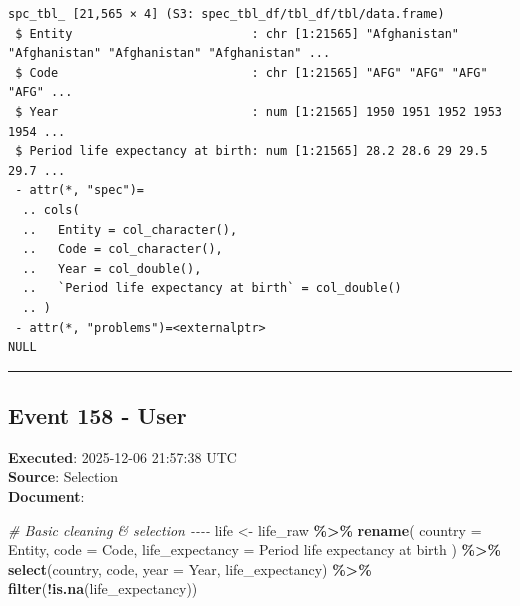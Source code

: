\documentclass[
  11pt,
]{article}
\newenvironment{Shaded}{\begin{snugshade}}{\end{snugshade}}
\newcommand{\AttributeTok}[1]{\textcolor[rgb]{0.13,0.29,0.53}{#1}}
\newcommand{\CommentTok}[1]{\textcolor[rgb]{0.56,0.35,0.01}{\textit{#1}}}
\newcommand{\FunctionTok}[1]{\textcolor[rgb]{0.13,0.29,0.53}{\textbf{#1}}}
\newcommand{\NormalTok}[1]{#1}
\newcommand{\OtherTok}[1]{\textcolor[rgb]{0.56,0.35,0.01}{#1}}
\newcommand{\SpecialCharTok}[1]{\textcolor[rgb]{0.81,0.36,0.00}{\textbf{#1}}}
\newcommand{\StringTok}[1]{\textcolor[rgb]{0.31,0.60,0.02}{#1}}
\newenvironment{rpoutput}{\vspace{0.5em}\begin{snugshade}}{\end{snugshade}}
\begin{document}
\begin{rpoutput}

\begin{verbatim}
spc_tbl_ [21,565 × 4] (S3: spec_tbl_df/tbl_df/tbl/data.frame)
 $ Entity                         : chr [1:21565] "Afghanistan" "Afghanistan" "Afghanistan" "Afghanistan" ...
 $ Code                           : chr [1:21565] "AFG" "AFG" "AFG" "AFG" ...
 $ Year                           : num [1:21565] 1950 1951 1952 1953 1954 ...
 $ Period life expectancy at birth: num [1:21565] 28.2 28.6 29 29.5 29.7 ...
 - attr(*, "spec")=
  .. cols(
  ..   Entity = col_character(),
  ..   Code = col_character(),
  ..   Year = col_double(),
  ..   `Period life expectancy at birth` = col_double()
  .. )
 - attr(*, "problems")=<externalptr> 
NULL
\end{verbatim}

\end{rpoutput}

\begin{center}\rule{0.5\linewidth}{0.5pt}\end{center}

\subsection{Event 158 - User}\label{event-158---user}

\textbf{Executed}: 2025-12-06 21:57:38 UTC\\
\textbf{Source}: Selection\\
\textbf{Document}:

\begin{Shaded}
\begin{Highlighting}[]
\CommentTok{\# Basic cleaning \& selection {-}{-}{-}{-}}
\NormalTok{life }\OtherTok{\textless{}{-}}\NormalTok{ life\_raw }\SpecialCharTok{\%\textgreater{}\%}
  \FunctionTok{rename}\NormalTok{(}
    \AttributeTok{country =}\NormalTok{ Entity,}
    \AttributeTok{code =}\NormalTok{ Code,}
    \AttributeTok{life\_expectancy =} \StringTok{\textasciigrave{}}\AttributeTok{Period life expectancy at birth}\StringTok{\textasciigrave{}}
\NormalTok{  ) }\SpecialCharTok{\%\textgreater{}\%}
  \FunctionTok{select}\NormalTok{(country, code, }\AttributeTok{year =}\NormalTok{ Year, life\_expectancy) }\SpecialCharTok{\%\textgreater{}\%}
  \FunctionTok{filter}\NormalTok{(}\SpecialCharTok{!}\FunctionTok{is.na}\NormalTok{(life\_expectancy))}
\end{Highlighting}
\end{Shaded}
\end{document}
